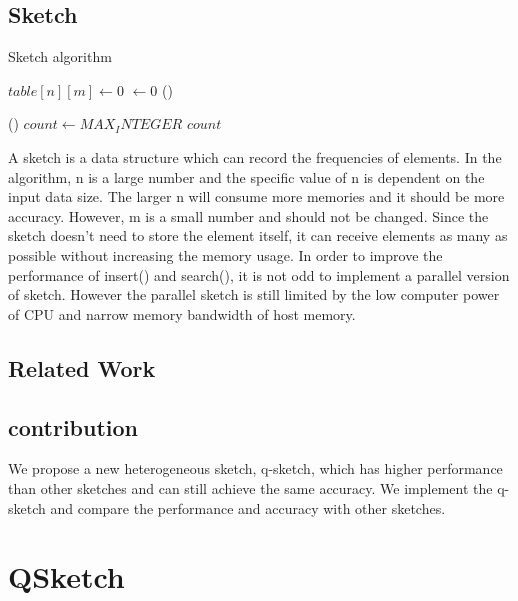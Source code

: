 \documentclass[conference]{IEEEtran}
\begin{document}
\subsection{Sketch}
\begin{algorithm}[H]
\DontPrintSemicolon
\caption{Sketch algorithm}
$table[n][m] \longleftarrow 0$\;
$ \longleftarrow 0$\;
\Fn()
{}
{
}

\Fn()
{}
{
    $count \leftarrow MAX_INTEGER$\;
    \KwRet $count$\;
}
\end{algorithm}

A sketch is a data structure which can record the frequencies of elements. In the algorithm, n is a large number and the specific value of n is dependent on the input data size. The larger n will consume more memories and it should be more accuracy. However, m is a small number and should not be changed. 
Since the sketch doesn't need to store the element itself, it can receive elements as many as possible without increasing the memory usage.  
In order to improve the performance of insert() and search(), it is not odd to implement a parallel version of sketch. However the parallel sketch is still limited by the low computer power of CPU and narrow memory bandwidth of host memory. 

\subsection{Related Work}
\subsection{contribution}
We propose a new heterogeneous sketch, q-sketch, which has higher performance than other sketches and can still achieve the same accuracy. We implement the q-sketch and compare the performance and accuracy with other sketches. 
\section{QSketch}
\end{document}
